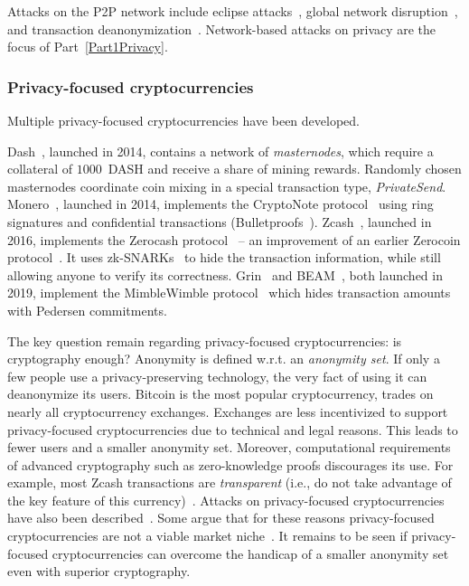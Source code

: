 Attacks on the P2P network include eclipse attacks~\cite{Marcus2018, Henningsen2019}, global network disruption~\cite{Apostolaki2017}, and transaction deanonymization~\cite{Biryukov2014}.
Network-based attacks on privacy are the focus of Part~\ref{Part1Privacy}.


\subsubsection*{Privacy-focused cryptocurrencies}

Multiple privacy-focused cryptocurrencies have been developed.

Dash~\cite{Dash}, launched in 2014, contains a network of \textit{masternodes}, which require a collateral of $1000$~DASH and receive a share of mining rewards.
Randomly chosen masternodes coordinate coin mixing in a special transaction type, \textit{PrivateSend}.
Monero~\cite{Monero}, launched in 2014, implements the CryptoNote protocol~\cite{Saberhagen2013} using ring signatures and confidential transactions (Bulletproofs~\cite{Buenz2018}).
Zcash~\cite{Zcash}, launched in 2016, implements the Zerocash protocol~\cite{BenSasson2014, Hopwood2020} -- an improvement of an earlier Zerocoin protocol~\cite{Miers2013}.
It uses zk-SNARKs~\cite{BenSasson2014a} to hide the transaction information, while still allowing anyone to verify its correctness.
Grin~\cite{Grin} and BEAM~\cite{Beam}, both launched in 2019, implement the MimbleWimble protocol~\cite{Jedusor2016} which hides transaction amounts with Pedersen commitments.

The key question remain regarding privacy-focused cryptocurrencies: is cryptography enough?
Anonymity is defined w.r.t. an \textit{anonymity set}.
If only a few people use a privacy-preserving technology, the very fact of using it can deanonymize its users.
Bitcoin is the most popular cryptocurrency, trades on nearly all cryptocurrency exchanges.
Exchanges are less incentivized to support privacy-focused cryptocurrencies due to technical and legal reasons.
This leads to fewer users and a smaller anonymity set.
Moreover, computational requirements of advanced cryptography such as zero-knowledge proofs discourages its use.
For example, most Zcash transactions are \textit{transparent} (i.e., do not take advantage of the key feature of this currency)~\cite{Quesnelle2017, Biryukov2019c}.
Attacks on privacy-focused cryptocurrencies have also been described~\cite{Moeser2018, Biryukov2019e, Tramer2020}.
Some argue that for these reasons privacy-focused cryptocurrencies are not a viable market niche~\cite{Gentry2019}.
It remains to be seen if privacy-focused cryptocurrencies can overcome the handicap of a smaller anonymity set even with superior cryptography.


